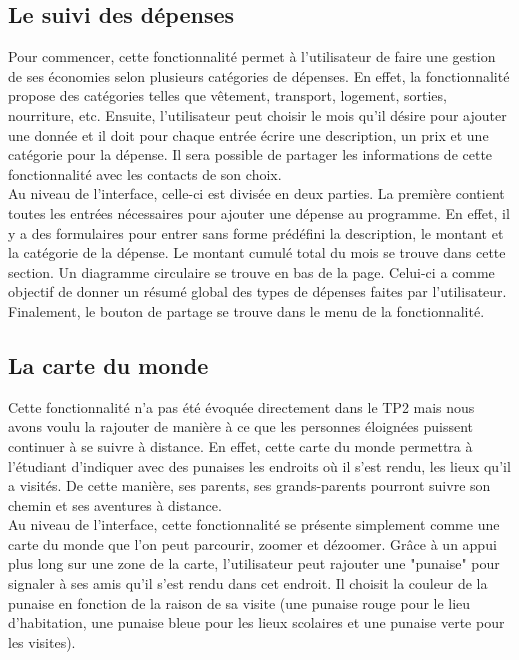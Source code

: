\documentclass[11pt]{article}
\begin{document}
\subsection{Le suivi des dépenses}\label{par:depenses}
Pour commencer, cette fonctionnalité permet à l’utilisateur de faire une gestion de ses économies selon plusieurs catégories de dépenses. En effet, la fonctionnalité propose des catégories telles que vêtement, transport, logement, sorties, nourriture, etc. Ensuite, l’utilisateur peut choisir le mois qu'il désire pour ajouter une donnée et il doit pour chaque entrée écrire une description, un prix et une catégorie pour la dépense. Il sera possible de partager les informations de cette fonctionnalité avec les contacts de son choix.~\\

Au niveau de l’interface, celle-ci est divisée en deux parties. La première contient toutes les entrées nécessaires pour ajouter une dépense au programme. En effet, il y a des formulaires pour entrer sans forme prédéfini la description, le montant et la catégorie de la dépense. Le montant cumulé total du mois se trouve dans cette section. Un diagramme circulaire se trouve en bas de la page. Celui-ci a comme objectif de donner un résumé global des types de dépenses faites par l’utilisateur. Finalement, le bouton de partage se trouve dans le  menu de la fonctionnalité.
\subsection{La carte du monde}\label{par:carte}
Cette fonctionnalité n'a pas été évoquée directement dans le TP2 mais nous avons voulu la rajouter de manière à ce que les personnes éloignées puissent continuer à se suivre à distance. En effet, cette carte du monde permettra à l'étudiant d'indiquer avec des punaises les endroits où il s'est rendu, les lieux qu'il a visités. De cette manière, ses parents, ses grands-parents pourront suivre son chemin et ses aventures à distance. ~\\

Au niveau de l'interface, cette fonctionnalité se présente simplement comme une carte du monde que l'on peut parcourir, zoomer et dézoomer. Grâce à un appui plus long sur une zone de la carte, l'utilisateur peut rajouter une "punaise" pour signaler à ses amis qu'il s'est rendu dans cet endroit. Il choisit la couleur de la punaise en fonction de la raison de sa visite (une punaise rouge pour le lieu d'habitation, une punaise bleue pour les lieux scolaires et une punaise verte pour les visites).
\end{document}
